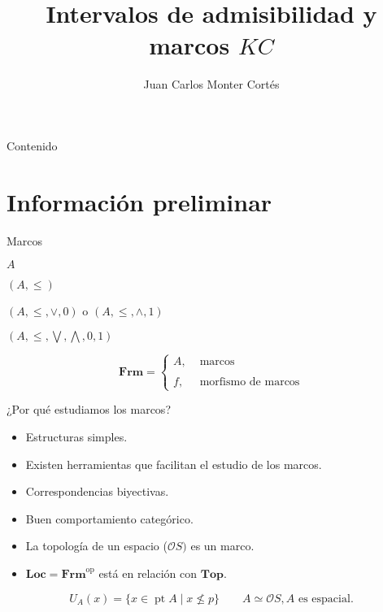 \documentclass[compress,12pt]{beamer}
\title{Intervalos de admisibilidad y marcos $KC$}
\author{Juan Carlos Monter Cortés}
\institute{Universidad de Guadalajara}
\DeclareMathOperator{\op}{op}
\DeclareMathOperator{\pt}{pt}
\begin{document}
\frame[plain]{\titlepage}

\begin{frame}{Contenido}
\tableofcontents %
\end{frame}

\section{Información preliminar}
\begin{frame}{Marcos}
    \begin{itemize}
        \begin{multicols}{2}
            \item $A$
            \item $(A, \leq)$
            \item $(A, \leq, \vee, 0)$ o $(A, \leq, \wedge, 1)$
            \item $(A, \leq, \bigvee, \bigwedge, 0, 1)$
        \end{multicols} 
        \end{itemize}
    
    
        \[
        \mathbf{Frm}=\left\{ \begin{array}{ll} A, & \mbox{ marcos}\\ \\  f, & \mbox{ morfismo de marcos} \end{array} \right.
        \]
\end{frame}

\begin{frame}{¿Por qué estudiamos los marcos?}
    \begin{itemize}
        \item Estructuras simples.
        \item<2-> Existen herramientas que facilitan el estudio de los marcos.
        \item<3-> Correspondencias biyectivas.
        \item<4-> Buen comportamiento categórico.
        \item<5-> \alert<8->{La topología de un espacio ($\mathcal{O}S)$ es un marco.}
        \item<6-> $\mathbf{Loc}=\mathbf{Frm}^{\op}$ está en relación con $\mathbf{Top}$.
    \end{itemize}        
    
    \[
    U_A(x)=\{x\in \pt A\mid x\nleq p\}\qquad A\simeq \mathcal{O}S, A \mbox{ es espacial}.
    \]
\end{frame}
\end{document}
